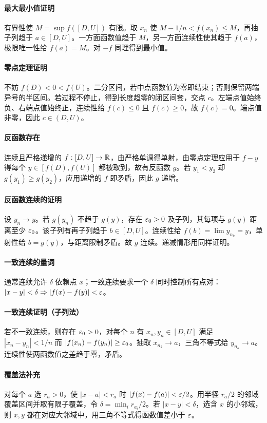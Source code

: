 \paragraph{最大最小值证明}有界性使 $M=\sup f([D,U])$ 有限。取 $x_n$ 使 $M-1/n<f(x_n)\le M$，再抽子列趋于 $a\in[D,U]$。一方面函数值趋于 $M$，另一方面连续性使其趋于 $f(a)$，极限唯一性给 $f(a)=M$。对 $-f$ 同理得到最小值。
\paragraph{零点定理证明}不妨 $f(D)<0<f(U)$。二分区间，若中点函数值为零即结束；否则保留两端异号的半区间。若过程不停止，得到长度趋零的闭区间套，交点 $c$。左端点值始终负、右端点值始终正，连续性给 $f(c)\le0$ 且 $f(c)\ge0$，故 $f(c)=0$。端点值非零，因此 $c\in(D,U)$。

\paragraph{反函数存在}连续且严格递增的 $f:[D,U]\to\mathbb{R}$，由严格单调得单射，由零点定理应用于 $f-y$ 得每个 $y\in[f(D),f(U)]$ 都被取到，故有反函数 $g$。若 $y_1<y_2$ 却 $g(y_1)\ge g(y_2)$，应用递增的 $f$ 即矛盾，因此 $g$ 递增。
\paragraph{反函数连续的证明}设 $y_n\to y$。若 $g(y_n)$ 不趋于 $g(y)$，存在 $\varepsilon_0>0$ 及子列，其每项与 $g(y)$ 距离至少 $\varepsilon_0$。该子列有再子列趋于 $b\in[D,U]$。连续性给 $f(b)=\lim y_{n_k}=y$，单射性给 $b=g(y)$，与距离限制矛盾。故 $g$ 连续。递减情形用同样证明。
\paragraph{一致连续的量词}通常连续允许 $\delta$ 依赖点 $x$；一致连续要求一个 $\delta$ 同时控制所有点对：$|x-y|<\delta\Rightarrow |f(x)-f(y)|<\varepsilon$。
\paragraph{一致连续证明（子列法）}若不一致连续，则存在 $\varepsilon_0>0$，对每个 $n$ 有 $x_n,y_n\in[D,U]$ 满足 $|x_n-y_n|<1/n$ 而 $|f(x_n)-f(y_n)|\ge\varepsilon_0$。抽取 $x_{n_k}\to a$，三角不等式给 $y_{n_k}\to a$。连续性使两函数值之差趋于零，矛盾。
\paragraph{覆盖法补充}对每个 $a$ 选 $r_a>0$，使 $|x-a|<r_a$ 时 $|f(x)-f(a)|<\varepsilon/2$。用半径 $r_a/2$ 的邻域覆盖区间并取有限子覆盖，令 $\delta=\min_i r_{a_i}/2$。若 $|x-y|<\delta$，选含 $x$ 的小邻域，则 $x,y$ 都在对应大邻域中，用三角不等式得函数值差小于 $\varepsilon$。

